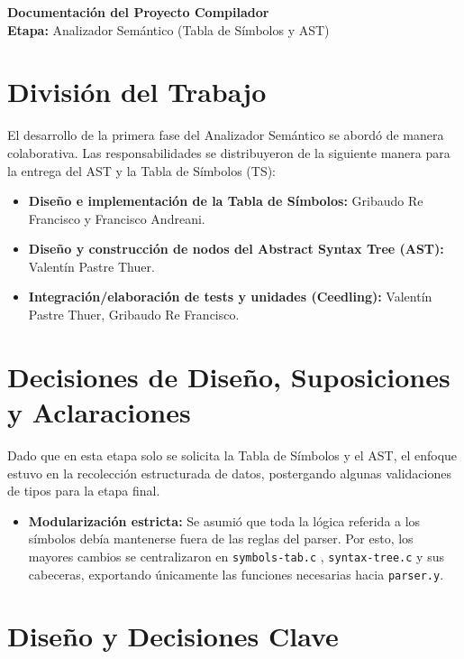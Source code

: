 \documentclass[11pt, a4paper]{article}
\begin{document}
\begin{center}
    {\LARGE \textbf{\textcolor{primary}{Documentación del Proyecto Compilador}}} \\
    \vspace{0.5cm}
    {\large \textbf{Etapa:} Analizador Semántico (Tabla de Símbolos y AST)}
\end{center}
\vspace{0.8cm}

\section{División del Trabajo}
El desarrollo de la primera fase del Analizador Semántico se abordó de manera colaborativa. Las responsabilidades se distribuyeron de la siguiente manera para la entrega del AST y la Tabla de Símbolos (TS):

\begin{itemize}
    \item \textbf{Diseño e implementación de la Tabla de Símbolos:} Gribaudo Re Francisco y Francisco Andreani.
    \item \textbf{Diseño y construcción de nodos del Abstract Syntax Tree (AST):}  Valentín Pastre Thuer.
    \item \textbf{Integración/elaboración de tests y unidades (Ceedling):} Valentín Pastre Thuer, Gribaudo Re Francisco.
\end{itemize}

\section{Decisiones de Diseño, Suposiciones y Aclaraciones}
Dado que en esta etapa solo se solicita la Tabla de Símbolos y el AST, el enfoque estuvo en la recolección estructurada de datos, postergando algunas validaciones de tipos para la etapa final.

\begin{itemize}
    \item \textbf{Modularización estricta:} Se asumió que toda la lógica referida a los símbolos debía mantenerse fuera de las reglas del parser. Por esto, los mayores cambios se centralizaron en \texttt{symbols-tab.c} , \texttt{syntax-tree.c} y sus cabeceras, exportando únicamente las funciones necesarias hacia \texttt{parser.y}.
\end{itemize}

\section{Diseño y Decisiones Clave}
\end{document}
